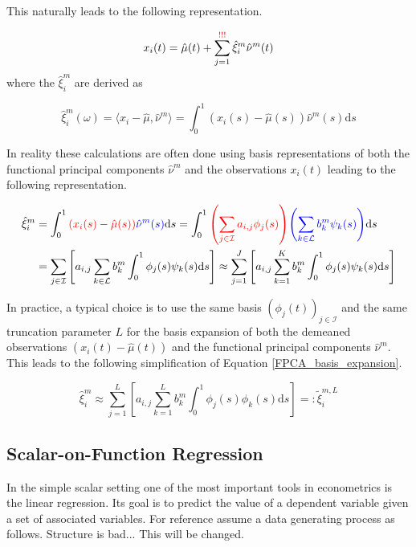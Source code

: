\documentclass[11pt,twoside,a4paper]{article}
\begin{document}
	This naturally leads to the following representation.
	
	\begin{equation}
		x_i(t) = \hat{\mu}(t) + \sum_{j = 1}^{{\color{red} !!!}} \hat{\xi}_{i}^{m} \hat{\nu}^{m}(t)
	\end{equation}
	where the $\hat{\xi}_{i}^m$ are derived as 
	
	\begin{equation}
		\hat{\xi}_i^m(\omega) = \langle x_i - \hat{\mu}, \hat{\nu}^m\rangle = \int_{0}^{1} \left(x_i(s) - \hat{\mu}(s)\right) \hat{\nu}^m(s) \mathrm{d}s
	\end{equation}
	
	In reality these calculations are often done using basis representations of both the functional principal components $\hat{\nu}^m$ and the observations $x_i(t)$ leading to the following representation.
	
	\begin{equation}\label{FPCA_basis_expansion}
		\begin{split}
			\hat{\xi}_{i}^m & = \int_{0}^{1} {\color{red}\left( x_i(s) - \hat{\mu}(s)\right)} {\color{blue}\hat{\nu}^m(s)} \mathrm{d}s
			= \int_{0}^{1} {\color{red}\left(\sum_{j \in \mathcal{I}} a_{i,j} \phi_j(s)\right)} {\color{blue}\left(\sum_{k \in \mathcal{L}} b_{k}^m \psi_{k}(s)\right)} \mathrm{d}s \\
			& = \sum_{j \in \mathcal{I}} \left[ a_{i,j}\sum_{k \in \mathcal{L}} b_{k}^m \int_{0}^{1} \phi_j(s) \psi_{k}(s)\mathrm{d}s\right] \approx \sum_{j = 1}^{J} \left[a_{i,j}\sum_{k = 1}^{K} b_{k}^m \int_{0}^{1} \phi_j(s) \psi_{k}(s)\mathrm{d}s \right]
		\end{split}
	\end{equation}
	
	In practice, a typical choice is to use the same basis $\left(\phi_j(t)\right)_{j \in \mathcal{I}}$ and the same truncation parameter $L$ for the basis expansion of both the demeaned observations $\left(x_i(t) - \hat{\mu}(t)\right)$ and the functional principal components $\hat{\nu}^m$. This leads to the following simplification of Equation \ref{FPCA_basis_expansion}.
	
	\begin{equation}\label{score_approx}
		\hat{\xi}_{i}^m \approx \sum_{j = 1}^{L} \left[ a_{i,j}\sum_{k = 1}^{L} b_{k}^m \int_{0}^{1} \phi_j(s) \phi_{k}(s)\mathrm{d}s\right] =: \tilde{\xi}^{m,L}_{i}
	\end{equation}
	
	\subsection{Scalar-on-Function Regression}
	In the simple scalar setting one of the most important tools in econometrics is the linear regression. Its goal is to predict the value of a dependent variable given a set of associated variables. For reference assume a data generating process as follows. {\color{red} Structure is bad... This will be changed.}
	
\end{document}
